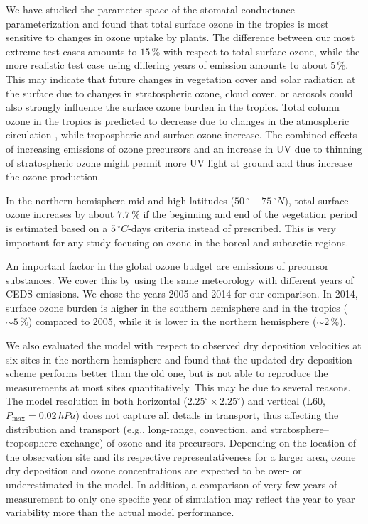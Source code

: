 \documentclass[gmd, manuscript]{copernicus}
\begin{document}
We have studied the parameter space of the stomatal conductance parameterization and found that total surface ozone in the tropics is most sensitive to changes in ozone uptake by plants. The difference between our most extreme test cases amounts to $15\,\unit{\%}$ with respect to total surface ozone, while the more realistic test case using differing years of emission amounts to about $5\,\unit{\%}$. This may indicate that future changes in vegetation cover and solar radiation at the surface due to changes in stratospheric ozone, cloud cover, or aerosols could also strongly influence the surface ozone burden in the tropics. Total column ozone in the tropics is predicted to decrease due to changes in the atmospheric circulation \citep[e.g.,][]{WMO2014}, while tropospheric and surface ozone increase. The combined effects of increasing emissions of ozone precursors and an increase in UV due to thinning of stratospheric ozone might permit more UV light at ground and thus increase the ozone production.

In the northern hemisphere mid and high latitudes ($50\,\unit{^\circ}-75\,\unit{^\circ N}$), total surface ozone increases by about $7.7\,\unit{\%}$ if the beginning and end of the vegetation period is estimated based on a $5\,\unit{^\circ C}$-days criteria instead of prescribed. This is very important for any study focusing on ozone in the boreal and subarctic regions.

An important factor in the global ozone budget are emissions of precursor substances. We cover this by using the same meteorology with different years of CEDS emissions. We chose the years 2005 and 2014 for our comparison. In 2014, surface ozone burden is higher in the southern hemisphere and in the tropics ($\sim 5\,\unit{\%}$) compared to 2005, while it is lower in the northern hemisphere ($\sim 2\,\unit{\%}$).

We also evaluated the model with respect to observed dry deposition velocities at six sites in the northern hemisphere and found that the updated dry deposition scheme performs better than the old one, but is not able to reproduce the measurements at most sites quantitatively. This may be due to several reasons. The model resolution in both horizontal ($2.25^\circ\times 2.25^\circ$) and vertical (L60, $P_\text{max}=0.02\,\unit{hPa}$) does not capture all details in transport, thus affecting the distribution and transport (e.g., long-range, convection, and stratosphere--troposphere exchange) of ozone and its precursors. Depending on the location of the observation site and its respective representativeness for a larger area, ozone dry deposition and ozone concentrations are expected to be over- or underestimated in the model. In addition, a comparison of very few years of measurement to only one specific year of simulation may reflect the year to year variability more than the actual model performance.
\end{document}

